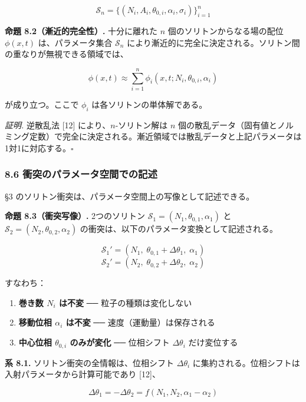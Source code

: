 \documentclass[a4paper,11pt]{ltjsarticle}
\providecommand{\tightlist}{\setlength{\itemsep}{0pt}\setlength{\parskip}{0pt}}
\begin{document}
\[\mathcal{S}_n = \{(N_i, A_i, \theta_{0,i}, \alpha_i, \sigma_i)\}_{i=1}^{n}\]

\textbf{命題 8.2（漸近的完全性）.} 十分に離れた \(n\)
個のソリトンからなる場の配位 \(\phi(x, t)\) は、パラメータ集合
\(\mathcal{S}_n\)
により漸近的に完全に決定される。ソリトン間の重なりが無視できる領域では、

\[\phi(x, t) \approx \sum_{i=1}^{n} \phi_i(x, t; N_i, \theta_{0,i}, \alpha_i)\]

が成り立つ。ここで \(\phi_i\) は各ソリトンの単体解である。

\emph{証明.} 逆散乱法 {[}12{]} により、\(n\)-ソリトン解は \(n\)
個の散乱データ（固有値とノルミング定数）で完全に決定される。漸近領域では散乱データと上記パラメータは1対1に対応する。\(\square\)

\subsubsection{8.6
衝突のパラメータ空間での記述}\label{ux885dux7a81ux306eux30d1ux30e9ux30e1ux30fcux30bfux7a7aux9593ux3067ux306eux8a18ux8ff0}

§3 のソリトン衝突は、パラメータ空間上の写像として記述できる。

\textbf{命題 8.3（衝突写像）.} 2つのソリトン
\(\mathcal{S}_1 = (N_1, \theta_{0,1}, \alpha_1)\) と
\(\mathcal{S}_2 = (N_2, \theta_{0,2}, \alpha_2)\)
の衝突は、以下のパラメータ変換として記述される。

\[\mathcal{S}_1' = (N_1,\; \theta_{0,1} + \Delta\theta_1,\; \alpha_1)\]
\[\mathcal{S}_2' = (N_2,\; \theta_{0,2} + \Delta\theta_2,\; \alpha_2)\]

すなわち：

\begin{enumerate}
\def\labelenumi{\arabic{enumi}.}
\tightlist
\item
  \textbf{巻き数 \(N_i\) は不変} ── 粒子の種類は変化しない
\item
  \textbf{移動位相 \(\alpha_i\) は不変} ── 速度（運動量）は保存される
\item
  \textbf{中心位相 \(\theta_{0,i}\) のみが変化} ── 位相シフト
  \(\Delta\theta_i\) だけ変位する
\end{enumerate}

\textbf{系 8.1.} ソリトン衝突の全情報は、位相シフト \(\Delta\theta_i\)
に集約される。位相シフトは入射パラメータから計算可能であり {[}12{]}、

\[\Delta\theta_1 = -\Delta\theta_2 = f(N_1, N_2, \alpha_1 - \alpha_2)\]
\end{document}
